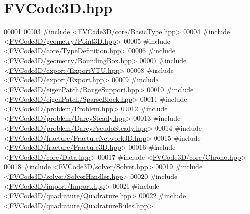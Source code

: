 \hypertarget{FVCode3D_8hpp_source}{}\section{F\+V\+Code3\+D.\+hpp}
\label{FVCode3D_8hpp_source}

\begin{DoxyCode}
00001 
00003 \textcolor{preprocessor}{#include <\hyperlink{BasicType_8hpp}{FVCode3D/core/BasicType.hpp}>}
00004 \textcolor{preprocessor}{#include <\hyperlink{Point3D_8hpp}{FVCode3D/geometry/Point3D.hpp}>}
00005 \textcolor{preprocessor}{#include <\hyperlink{TypeDefinition_8hpp}{FVCode3D/core/TypeDefinition.hpp}>}
00006 \textcolor{preprocessor}{#include <\hyperlink{BoundingBox_8hpp}{FVCode3D/geometry/BoundingBox.hpp}>}
00007 \textcolor{preprocessor}{#include <\hyperlink{ExportVTU_8hpp}{FVCode3D/export/ExportVTU.hpp}>}
00008 \textcolor{preprocessor}{#include <\hyperlink{Export_8hpp}{FVCode3D/export/Export.hpp}>}
00009 \textcolor{preprocessor}{#include <\hyperlink{RangeSupport_8hpp}{FVCode3D/eigenPatch/RangeSupport.hpp}>}
00010 \textcolor{preprocessor}{#include <\hyperlink{SparseBlock_8hpp}{FVCode3D/eigenPatch/SparseBlock.hpp}>}
00011 \textcolor{preprocessor}{#include <\hyperlink{Problem_8hpp}{FVCode3D/problem/Problem.hpp}>}
00012 \textcolor{preprocessor}{#include <\hyperlink{DarcySteady_8hpp}{FVCode3D/problem/DarcySteady.hpp}>}
00013 \textcolor{preprocessor}{#include <\hyperlink{DarcyPseudoSteady_8hpp}{FVCode3D/problem/DarcyPseudoSteady.hpp}>}
00014 \textcolor{preprocessor}{#include <\hyperlink{FractureNetwork3D_8hpp}{FVCode3D/fracture/FractureNetwork3D.hpp}>}
00015 \textcolor{preprocessor}{#include <\hyperlink{Fracture3D_8hpp}{FVCode3D/fracture/Fracture3D.hpp}>}
00016 \textcolor{preprocessor}{#include <\hyperlink{Data_8hpp}{FVCode3D/core/Data.hpp}>}
00017 \textcolor{preprocessor}{#include <\hyperlink{Chrono_8hpp}{FVCode3D/core/Chrono.hpp}>}
00018 \textcolor{preprocessor}{#include <\hyperlink{Solver_8hpp}{FVCode3D/solver/Solver.hpp}>}
00019 \textcolor{preprocessor}{#include <\hyperlink{SolverHandler_8hpp}{FVCode3D/solver/SolverHandler.hpp}>}
00020 \textcolor{preprocessor}{#include <\hyperlink{Import_8hpp}{FVCode3D/import/Import.hpp}>}
00021 \textcolor{preprocessor}{#include <\hyperlink{Quadrature_8hpp}{FVCode3D/quadrature/Quadrature.hpp}>}
00022 \textcolor{preprocessor}{#include <\hyperlink{QuadratureRules_8hpp}{FVCode3D/quadrature/QuadratureRules.hpp}>}

\end{DoxyCode}
